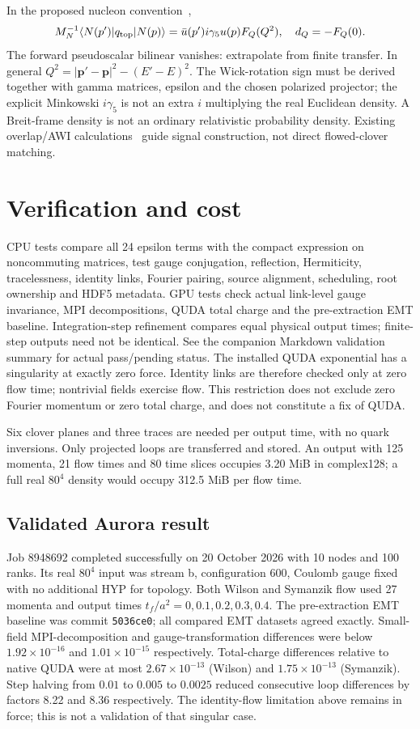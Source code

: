 \documentclass[11pt,a4paper]{article}
\begin{document}
In the proposed nucleon convention~\cite{fukushima},
\begin{equation}
 M_N^{-1}\langle N(p')|q_{\rm top}|N(p)\rangle
 =\bar u(p')i\gamma_5u(p)F_Q(Q^2),\quad d_Q=-F_Q(0).
\end{equation}
The forward pseudoscalar bilinear vanishes: extrapolate from finite transfer.
In general $Q^2=|\mathbf p'-\mathbf p|^2-(E'-E)^2$.
The Wick-rotation sign must be derived together with gamma matrices, epsilon
and the chosen polarized projector; the explicit Minkowski $i\gamma_5$ is not
an extra $i$ multiplying the real Euclidean density. A Breit-frame density is
not an ordinary relativistic probability density. Existing overlap/AWI
calculations~\cite{gong} guide signal construction, not direct flowed-clover
matching.

\section{Verification and cost}
CPU tests compare all 24 epsilon terms with the compact expression on
noncommuting matrices, test gauge conjugation, reflection, Hermiticity,
tracelessness, identity links, Fourier pairing, source alignment, scheduling,
root ownership and HDF5 metadata. GPU tests check actual link-level gauge
invariance, MPI decompositions, QUDA total charge and the pre-extraction EMT
baseline. Integration-step refinement compares equal physical output times;
finite-step outputs need not be identical. See the companion Markdown
validation summary for actual pass/pending status.
The installed QUDA exponential has a singularity at exactly zero force.
Identity links are therefore checked only at zero flow time; nontrivial
fields exercise flow. This restriction does not exclude zero Fourier momentum
or zero total charge, and does not constitute a fix of QUDA.

Six clover planes and three traces are needed per output time, with no quark
inversions. Only projected loops are transferred and stored. An output with
125 momenta, 21 flow times and 80 time slices occupies 3.20 MiB in complex128;
a full real $80^4$ density would occupy 312.5 MiB per flow time.

\subsection{Validated Aurora result}
Job 8948692 completed successfully on 20 October 2026 with 10 nodes and 100
ranks. Its real $80^4$ input was stream b, configuration 600, Coulomb gauge
fixed with no additional HYP for topology. Both Wilson and Symanzik flow used
27 momenta and output times $t_f/a^2=0,0.1,0.2,0.3,0.4$.
The pre-extraction EMT baseline was commit \texttt{5036ce0}; all compared EMT
datasets agreed exactly. Small-field MPI-decomposition and gauge-transformation
differences were below $1.92\times10^{-16}$ and $1.01\times10^{-15}$ respectively.
Total-charge differences relative to native QUDA were at most
$2.67\times10^{-13}$ (Wilson) and $1.75\times10^{-13}$ (Symanzik).
Step halving from $0.01$ to $0.005$ to $0.0025$ reduced consecutive loop
differences by factors 8.22 and 8.36 respectively. The identity-flow limitation
above remains in force; this is not a validation of that singular case.
\end{document}
